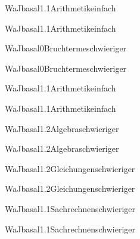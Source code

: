 \documentclass[12pt]{article}
\begin{document}
\begin{Add}{WaJ}{basal1.1}{Arithmetik}{einfach}
\solution{ }
\end{Add}
\begin{Add}{WaJ}{basal1.1}{Arithmetik}{einfach}
\end{Add}

\begin{Add}{WaJ}{basal0}{Bruchterme}{schwieriger}
\solution{ }
\end{Add}
\begin{Add}{WaJ}{basal0}{Bruchterme}{schwieriger}
\end{Add}

\begin{Add}{WaJ}{basal1.1}{Arithmetik}{einfach}
\solution{ }
\end{Add}
\begin{Add}{WaJ}{basal1.1}{Arithmetik}{einfach}
\end{Add}

\begin{Add}{WaJ}{basal1.2}{Algebra}{schwieriger}
\solution{ }
\end{Add}
\begin{Add}{WaJ}{basal1.2}{Algebra}{schwieriger}
\end{Add}

    \begin{Add}{WaJ}{basal1.2}{Gleichungen}{schwieriger}
    \solution{ }
    \end{Add}
    \begin{Add}{WaJ}{basal1.2}{Gleichungen}{schwieriger}
    \end{Add}
    

\begin{Add}{WaJ}{basal1.1}{Sachrechnen}{schwieriger}
\solution{ }
\end{Add}
\begin{Add}{WaJ}{basal1.1}{Sachrechnen}{schwieriger}
\end{Add}
\end{document}
